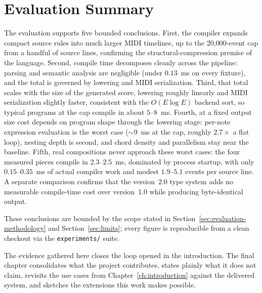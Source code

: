 \section{Evaluation Summary}\label{sec:evaluation-summary}

The evaluation supports five bounded conclusions.
First, the compiler expands compact source rules into much larger MIDI timelines, up to the 20{,}000-event cap from a
handful of source lines, confirming the structural-compression premise of the language.
Second, compile time decomposes cleanly across the pipeline: parsing and semantic analysis are negligible (under
$0.13$~ms on every fixture), and the total is governed by lowering and MIDI serialization.
Third, that total scales with the size of the generated score, lowering roughly linearly and MIDI serialization
slightly faster, consistent with the $O(E \log E)$ backend sort, so typical programs at the cap compile in about
$5$--$8$~ms.
Fourth, at a fixed output size cost depends on program shape through the lowering stage: per-note expression evaluation
is the worst case ($\sim$9~ms at the cap, roughly $2.7\times$ a flat loop), nesting depth is second, and chord density
and parallelism stay near the baseline.
Fifth, real compositions never approach these worst cases: the four measured pieces compile in $2.3$--$2.5$~ms,
dominated by process startup, with only $0.15$--$0.35$~ms of actual compiler work and modest $1.9$--$5.1$ events per
source line.
A separate comparison confirms that the version~2.0 type system adds no measurable compile-time cost over version~1.0
while producing byte-identical output.

These conclusions are bounded by the scope stated in Section~\ref{sec:evaluation-methodology} and
Section~\ref{sec:limits}; every figure is reproducible from a clean checkout via the \texttt{experiments/} suite.

The evidence gathered here closes the loop opened in the introduction.
The final chapter consolidates what the project contributes, states plainly what it does not claim, revisits the use
cases from Chapter~\ref{ch:introduction} against the delivered system, and sketches the extensions this work makes
possible.
